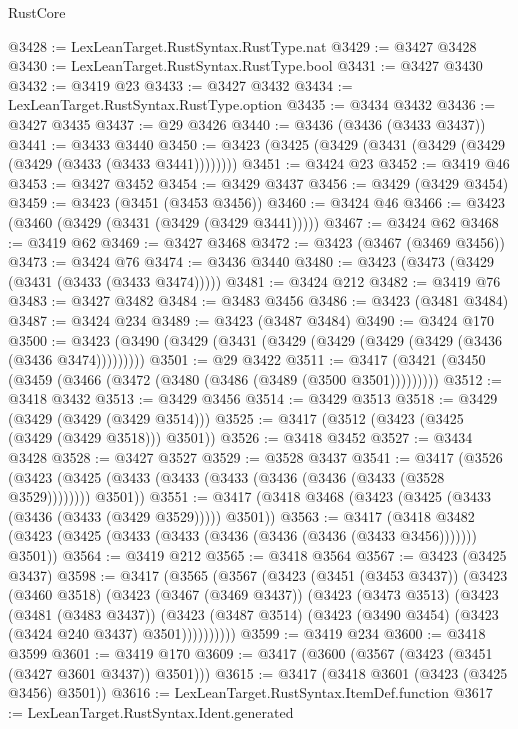 \begin{lexlean}{RustCore}
\begin{coremodule}
@3428 := LexLeanTarget.RustSyntax.RustType.nat
@3429 := @3427 @3428
@3430 := LexLeanTarget.RustSyntax.RustType.bool
@3431 := @3427 @3430
@3432 := @3419 @23
@3433 := @3427 @3432
@3434 := LexLeanTarget.RustSyntax.RustType.option
@3435 := @3434 @3432
@3436 := @3427 @3435
@3437 := @29 @3426
@3440 := @3436 (@3436 (@3433 @3437))
@3441 := @3433 @3440
@3450 := @3423 (@3425 (@3429 (@3431 (@3429 (@3429 (@3429 (@3433 (@3433 @3441))))))))
@3451 := @3424 @23
@3452 := @3419 @46
@3453 := @3427 @3452
@3454 := @3429 @3437
@3456 := @3429 (@3429 @3454)
@3459 := @3423 (@3451 (@3453 @3456))
@3460 := @3424 @46
@3466 := @3423 (@3460 (@3429 (@3431 (@3429 (@3429 @3441)))))
@3467 := @3424 @62
@3468 := @3419 @62
@3469 := @3427 @3468
@3472 := @3423 (@3467 (@3469 @3456))
@3473 := @3424 @76
@3474 := @3436 @3440
@3480 := @3423 (@3473 (@3429 (@3431 (@3433 (@3433 @3474)))))
@3481 := @3424 @212
@3482 := @3419 @76
@3483 := @3427 @3482
@3484 := @3483 @3456
@3486 := @3423 (@3481 @3484)
@3487 := @3424 @234
@3489 := @3423 (@3487 @3484)
@3490 := @3424 @170
@3500 := @3423 (@3490 (@3429 (@3431 (@3429 (@3429 (@3429 (@3429 (@3436 (@3436 @3474)))))))))
@3501 := @29 @3422
@3511 := @3417 (@3421 (@3450 (@3459 (@3466 (@3472 (@3480 (@3486 (@3489 (@3500 @3501)))))))))
@3512 := @3418 @3432
@3513 := @3429 @3456
@3514 := @3429 @3513
@3518 := @3429 (@3429 (@3429 (@3429 @3514)))
@3525 := @3417 (@3512 (@3423 (@3425 (@3429 (@3429 @3518))) @3501))
@3526 := @3418 @3452
@3527 := @3434 @3428
@3528 := @3427 @3527
@3529 := @3528 @3437
@3541 := @3417
    (@3526 (@3423 (@3425 (@3433 (@3433 (@3433 (@3436 (@3436 (@3433 (@3528 @3529)))))))) @3501))
@3551 := @3417 (@3418 @3468 (@3423 (@3425 (@3433 (@3436 (@3433 (@3429 @3529))))) @3501))
@3563 := @3417
    (@3418 @3482 (@3423 (@3425 (@3433 (@3433 (@3436 (@3436 (@3436 (@3433 @3456))))))) @3501))
@3564 := @3419 @212
@3565 := @3418 @3564
@3567 := @3423 (@3425 @3437)
@3598 := @3417
    (@3565
      (@3567
        (@3423
          (@3451 (@3453 @3437))
          (@3423
            (@3460 @3518)
            (@3423
              (@3467 (@3469 @3437))
              (@3423
                (@3473 @3513)
                (@3423
                  (@3481 (@3483 @3437))
                  (@3423
                    (@3487 @3514)
                    (@3423 (@3490 @3454) (@3423 (@3424 @240 @3437) @3501))))))))))
@3599 := @3419 @234
@3600 := @3418 @3599
@3601 := @3419 @170
@3609 := @3417 (@3600 (@3567 (@3423 (@3451 (@3427 @3601 @3437)) @3501)))
@3615 := @3417 (@3418 @3601 (@3423 (@3425 @3456) @3501))
@3616 := LexLeanTarget.RustSyntax.ItemDef.function
@3617 := LexLeanTarget.RustSyntax.Ident.generated

\end{coremodule}
\end{lexlean}
